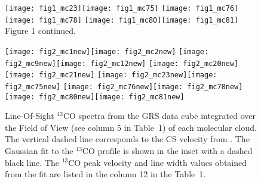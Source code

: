 \documentclass[iop]{emulateapj}
\begin{document}

\begin{figure*}
\vspace*{2mm}
\texttt{[image: fig1\_mc23]}\hspace*{3mm}\texttt{[image: fig1\_mc75]}
\vspace*{2mm}
\texttt{[image: fig1\_mc76]}\hspace*{3mm}\texttt{[image: fig1\_mc78]}
\texttt{[image: fig1\_mc80]}\hspace*{3mm}\texttt{[image: fig1\_mc81]}\\
Figure 1 continued. 
\label{figure1}
\end{figure*}

\begin{figure*}[!t]
\texttt{[image: fig2\_mc1new]}\texttt{[image: fig2\_mc2new]}  
\texttt{[image: fig2\_mc9new]}\texttt{[image: fig2\_mc12new]}  
\texttt{[image: fig2\_mc20new]}\texttt{[image: fig2\_mc21new]} 
\texttt{[image: fig2\_mc23new]}\texttt{[image: fig2\_mc75new]} 
\texttt{[image: fig2\_mc76new]}\texttt{[image: fig2\_mc78new]} 
\texttt{[image: fig2\_mc80new]}\texttt{[image: fig2\_mc81new]}
\caption{ 
Line-Of-Sight $^{13}$CO spectra from the GRS data cube integrated over the Field of 
View (see column 5 in Table~1) of each molecular cloud. 
The vertical dashed line corresponds to the CS velocity from \citet{bronfman+96}. 
The Gaussian fit to the $^{13}$CO profile is shown in the inset 
with a dashed black line. The $^{13}$CO peak velocity and line width values obtained 
from the fit are listed in the column 12 in the Table~1.}

\label{figure2}
\end{figure*}
\end{document}
